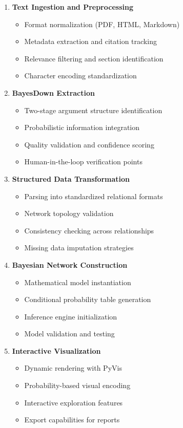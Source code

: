 \documentclass[
  11pt,
  letterpaper,
]{book}
\providecommand{\tightlist}{%
  \setlength{\itemsep}{0pt}\setlength{\parskip}{0pt}}
\begin{document}
\begin{enumerate}
\def\labelenumi{\arabic{enumi}.}
\tightlist
\item
  \textbf{Text Ingestion and Preprocessing}

  \begin{itemize}
  \tightlist
  \item
    Format normalization (PDF, HTML, Markdown)
  \item
    Metadata extraction and citation tracking
  \item
    Relevance filtering and section identification
  \item
    Character encoding standardization
  \end{itemize}
\item
  \textbf{BayesDown Extraction}

  \begin{itemize}
  \tightlist
  \item
    Two-stage argument structure identification
  \item
    Probabilistic information integration
  \item
    Quality validation and confidence scoring
  \item
    Human-in-the-loop verification points
  \end{itemize}
\item
  \textbf{Structured Data Transformation}

  \begin{itemize}
  \tightlist
  \item
    Parsing into standardized relational formats
  \item
    Network topology validation
  \item
    Consistency checking across relationships
  \item
    Missing data imputation strategies
  \end{itemize}
\item
  \textbf{Bayesian Network Construction}

  \begin{itemize}
  \tightlist
  \item
    Mathematical model instantiation
  \item
    Conditional probability table generation
  \item
    Inference engine initialization
  \item
    Model validation and testing
  \end{itemize}
\item
  \textbf{Interactive Visualization}

  \begin{itemize}
  \tightlist
  \item
    Dynamic rendering with PyVis
  \item
    Probability-based visual encoding
  \item
    Interactive exploration features
  \item
    Export capabilities for reports
  \end{itemize}
\end{enumerate}
\end{document}
